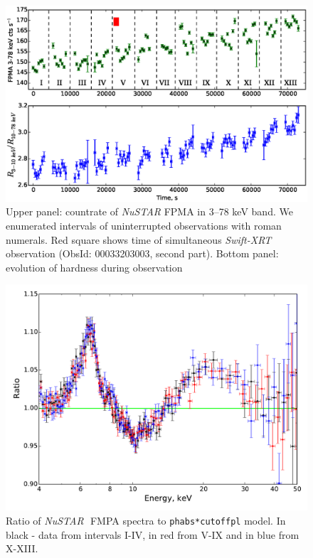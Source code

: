 \documentclass[a4paper,fleqn,usenatbib]{mnras}
\def\swiftx{{\em Swift-XRT\,}}
\def\nustar{{\em NuSTAR\,}}
\begin{document}
\begin{figure}
\centerline{\includegraphics[scale=0.7]{nuAlc_color_v04.eps}}
\caption{Upper panel: countrate of \nustar\,FPMA in 3--78 keV band. We enumerated intervals of uninterrupted observations with roman numerals. Red square shows time of simultaneous \swiftx observation (ObsId: 00033203003, second part). Bottom panel: evolution of hardness during observation} 
\label{fig:nust_lc}
\end{figure} 
 \begin{figure}
\centerline{\includegraphics[width=\linewidth]{ratios_v01.pdf}}
\caption{Ratio of \nustar\, FMPA spectra to \texttt{phabs*cutoffpl} model. In black - data from intervals I-IV, in red from V-IX and in blue from X-XIII.} 
\label{fig:ratios}
\end{figure}  
\end{document}
